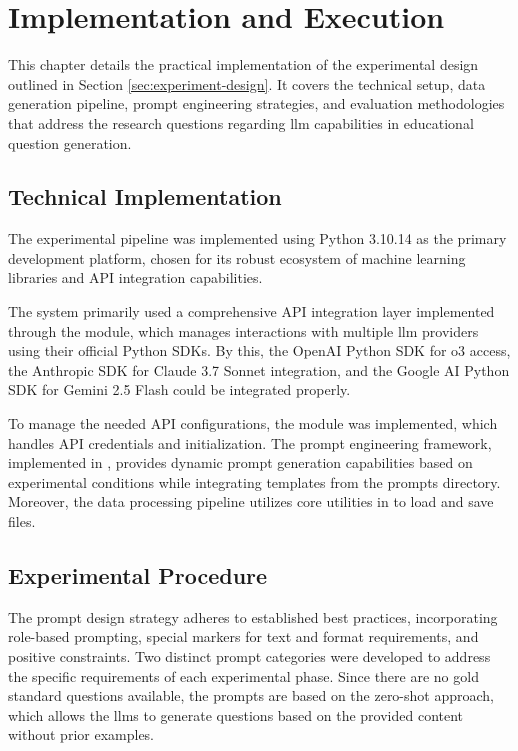 \section{Implementation and Execution} 
\label{sec:implementation-and-execution}

This chapter details the practical implementation of the experimental design outlined in Section \ref{sec:experiment-design}. It covers the technical setup, data generation pipeline, prompt engineering strategies, and evaluation methodologies that address the research questions regarding \ac{llm} capabilities in educational question generation.

\subsection{Technical Implementation}

The experimental pipeline was implemented using Python 3.10.14 as the primary development platform, chosen for its robust ecosystem of machine learning libraries and API integration capabilities.

The system primarily used a comprehensive API integration layer implemented through the  module, which manages interactions with multiple \ac{llm} providers using their official Python SDKs. By this, the OpenAI Python SDK for o3 access, the Anthropic SDK for Claude 3.7 Sonnet integration, and the Google AI Python SDK for Gemini 2.5 Flash could be integrated properly. 

To manage the needed API configurations, the  module was implemented, which handles API credentials and initialization. The prompt engineering framework, implemented in , provides dynamic prompt generation capabilities based on experimental conditions while integrating templates from the prompts directory. Moreover, the data processing pipeline utilizes core utilities in  to load and save files.

\subsection{Experimental Procedure}

The prompt design strategy adheres to established best practices, incorporating role-based prompting, special markers for text and format requirements, and positive constraints. Two distinct prompt categories were developed to address the specific requirements of each experimental phase. Since there are no gold standard questions available, the prompts are based on the zero-shot approach, which allows the \ac{llms} to generate questions based on the provided content without prior examples.

